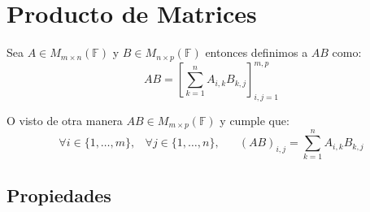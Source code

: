 \documentclass[12pt]{report}                                    %
\DeclareMathOperator \Space {\quad}                             %
\DeclareMathOperator \MiniSpace {\;}                            %
\newcommand{\Brackets}[1]{\left[ #1 \right]}                    %
\begin{document}
        \clearpage
        \section{Producto de Matrices}

            Sea $A \in M_{m \times n}(\mathbb{F})$ y $B \in M_{n \times p}(\mathbb{F})$ entonces 
            definimos a $AB$ como:
            \begin{equation}
                AB = \Brackets{\sum_{k=1}^{n} A_{i, k}B_{k, j} }_{i, j = 1}^{m, p}
            \end{equation}

            O visto de otra manera $AB \in M_{m \times p}(\mathbb{F})$ y cumple que:
            \begin{equation}
                \forall i \in \{1, \dots, m\} ,\MiniSpace
                    \forall j \in \{1, \dots, n\} ,\Space
                        (AB)_{i, j} = \sum_{k=1}^{n} A_{i, k}B_{k, j}
            \end{equation}


            \clearpage
            \subsection{Propiedades}
\end{document}
